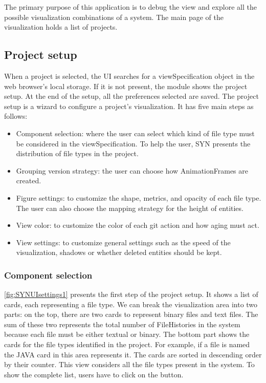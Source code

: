 The primary purpose of this application is to debug the view and explore all the possible visualization combinations of a system.
The main page of the visualization holds a list of projects.

\subsection*{Project setup}
When a project is selected, the UI searches for a viewSpecification object in the web browser's local storage. 
If it is not present, the module shows the project setup. At the end of the setup, all the preferences selected are saved. 
The project setup is a wizard to configure a project's visualization. It has five main steps as follows:
\begin{itemize}
    \item Component selection: where the user can select which kind of file type must be considered in the viewSpecification. To help the user, SYN presents the distribution of file types in the project.
    \item Grouping version strategy: the user can choose how AnimationFrames are created.
    \item Figure settings: to customize the shape, metrics, and opacity of each file type. The user can also choose the mapping strategy for the height of entities. 
    \item View color: to customize the color of each git action and how aging must act. 
    \item View settings: to customize general settings such as the speed of the visualization, shadows or whether deleted entities should be kept. 
\end{itemize}

\subsubsection*{Component selection}
\autoref{fig:SYNUIsettings1} presents the first step of the project setup. It shows a list of cards, each representing a file type. 
We can break the visualization area into two parts: on the top, there are two cards to represent binary files and text files. 
The sum of these two represents the total number of FileHistories in the system because each file must be either textual or binary. 
The bottom part shows the cards for the file types identified in the project. For example, if a file is named  the JAVA card in this area represents it. 
The cards are sorted in descending order by their counter. This view considers all the file types present in the system. To show the complete list, users have to click on the  button.

